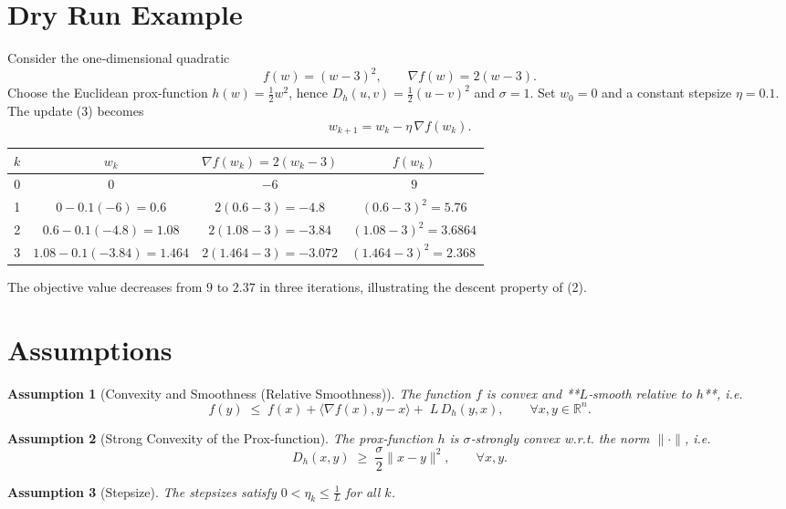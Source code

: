 \documentclass{article}
\newtheorem{assumption}{Assumption}
\begin{document}
\section*{Dry Run Example}
Consider the one‑dimensional quadratic
\[
f(w)=(w-3)^{2},\qquad \nabla f(w)=2(w-3).
\]
Choose the Euclidean prox‑function $h(w)=\tfrac12 w^{2}$, hence
$D_h(u,v)=\tfrac12 (u-v)^{2}$ and $\sigma=1$.
Set $w_{0}=0$ and a constant stepsize $\eta=0.1$.
The update (3) becomes
\[
w_{k+1}=w_{k}-\eta\,\nabla f(w_{k}).
\]

\begin{center}
\begin{tabular}{c|c|c|c}
$k$ & $w_k$ & $\nabla f(w_k)=2(w_k-3)$ & $f(w_k)$\\\hline
0 & $0$ & $-6$ & $9$\\
1 & $0-0.1(-6)=0.6$ & $2(0.6-3)=-4.8$ & $(0.6-3)^{2}=5.76$\\
2 & $0.6-0.1(-4.8)=1.08$ & $2(1.08-3)=-3.84$ & $(1.08-3)^{2}=3.6864$\\
3 & $1.08-0.1(-3.84)=1.464$ & $2(1.464-3)=-3.072$ & $(1.464-3)^{2}=2.368\,$
\end{tabular}
\end{center}
The objective value decreases from $9$ to $2.37$ in three iterations,
illustrating the descent property of (2).

\section*{Assumptions}
\begin{assumption}[Convexity and Smoothness (Relative Smoothness)]
\label{ass:rel_smooth}
The function $f$ is convex and **$L$‑smooth relative to $h$**, i.e.
\[
f(y)\;\le\;f(x)+\langle\nabla f(x),y-x\rangle
+\;L\,D_{h}(y,x),\qquad\forall x,y\in\mathbb{R}^{n}.
\tag{4}
\]
\end{assumption}
\begin{assumption}[Strong Convexity of the Prox‑function]
\label{ass:h_strong}
The prox‑function $h$ is $\sigma$‑strongly convex w.r.t. the norm
$\|\cdot\|$, i.e.
\[
D_{h}(x,y)\;\ge\;\frac{\sigma}{2}\|x-y\|^{2},
\qquad\forall x,y.
\tag{5}
\]
\end{assumption}
\begin{assumption}[Stepsize]
\label{ass:stepsize}
The stepsizes satisfy $0<\eta_k\le\frac{1}{L}$ for all $k$.
\end{assumption}
\end{document}
